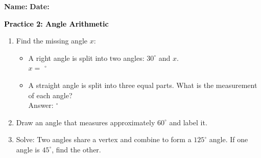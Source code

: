 \documentclass[12pt, letterpaper, fleqn]{article}
\newcommand{\blank}{\underline{\hspace{2.2cm}}}
\begin{document}
\textbf{Name:} \underline{\hspace{5cm}}
\hfill
\textbf{Date:} \underline{\hspace{3cm}}\\

\begin{tcolorbox}[colback=customteal!20]
    \large\textcolor{black}{\textbf{Practice 2: Angle Arithmetic}}
\end{tcolorbox}

\vspace{5mm}
\begin{enumerate}[itemsep=3cm, leftmargin=0.6cm]
\item Find the missing angle $x$:
  \begin{itemize}[itemsep=1cm]
    \item A right angle is split into two angles: $30^\circ$ and $x$. \\ $x =$ \blank $^\circ$
    \item A straight angle is split into three equal parts. What is the measurement of each angle? \\ Answer: \blank $^\circ$
  \end{itemize}

\item Draw an angle that measures approximately $60^\circ$ and label it.
\vspace{4cm}

\item Solve: Two angles share a vertex and combine to form a $125^\circ$ angle. If one angle is $45^\circ$, find the other.
\end{enumerate}
\end{document}
